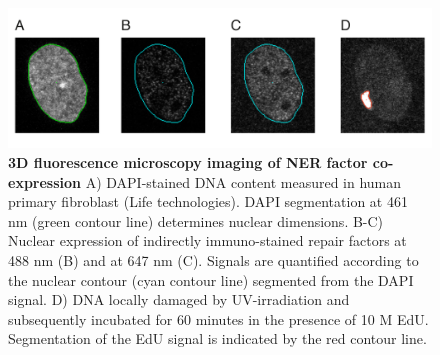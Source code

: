 \begin{figure}[htbp]
	\begin{center}
		\includegraphics[width=1\textwidth]{Abbildungen/figure4_1.pdf}
		\caption{\textbf{3D fluorescence microscopy imaging of NER factor co-expression} A) DAPI-stained DNA content measured in human primary fibroblast (Life technologies). DAPI segmentation at 461 nm  (green contour line) determines nuclear dimensions. B-C) Nuclear expression of indirectly immuno-stained repair factors at 488 nm (B) and at 647 nm (C). Signals are quantified according to the nuclear contour (cyan contour line) segmented from the DAPI signal. D) DNA locally damaged by UV-irradiation and subsequently incubated for 60 minutes in the presence of 10 \textmu M EdU. Segmentation of the EdU signal is indicated by the red contour line.   }
		\label{fig:coStaining}
	\end{center}
\end{figure}

